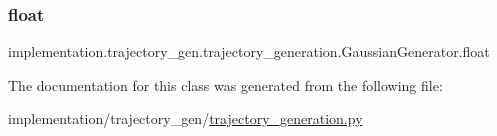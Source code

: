 \subsubsection{\texorpdfstring{float}{float}}
{\footnotesize\ttfamily implementation.\+trajectory\+\_\+gen.\+trajectory\+\_\+generation.\+Gaussian\+Generator.\+float\hspace{0.3cm}{\ttfamily [static]}}



The documentation for this class was generated from the following file\+:\begin{DoxyCompactItemize}
\item 
implementation/trajectory\+\_\+gen/\hyperlink{trajectory__generation_8py}{trajectory\+\_\+generation.\+py}\end{DoxyCompactItemize}
